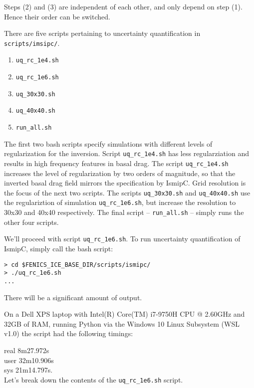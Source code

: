 \documentclass[11pt, reqno, nocenter]{article}
\begin{document}
Steps (2) and (3) are independent of each other, and only depend on step (1). Hence their order can be switched.

There are five scripts pertaining to uncertainty quantification in {\tt scripts/imsipc/}.
\begin{enumerate}
	\item {\tt uq\_rc\_1e4.sh  }
	\item {\tt uq\_rc\_1e6.sh}
	\item {\tt uq\_30x30.sh  }
	\item {\tt uq\_40x40.sh  }
	\item {\tt run\_all.sh}  
\end{enumerate}

The first two bash scripts specify simulations with different levels of regularization for the inversion. Script {\tt uq\_rc\_1e4.sh} has less regularziation and results in high frequency features in basal drag. The script {\tt uq\_rc\_1e4.sh} increases the level of regularization by two orders of magnitude, so that the inverted basal drag field mirrors the specification by IsmipC. Grid resolution is the focus of the next two scripts. The scripts {\tt uq\_30x30.sh} and {\tt uq\_40x40.sh} use the regulariztion of simulation {\tt uq\_rc\_1e6.sh}, but increase the resolution to 30x30 and 40x40 respectively. The final script -- {\tt run\_all.sh}  -- simply runs the other four scripts.

We'll proceed with script {\tt uq\_rc\_1e6.sh}. To run uncertainty quantification of IsmipC, simply call the bash script:
\begin{verbatim}
> cd $FENICS_ICE_BASE_DIR/scripts/ismipc/
> ./uq_rc_1e6.sh
...
\end{verbatim}

There will be a significant amount of output. 

On a Dell XPS laptop with Intel(R) Core(TM) i7-9750H CPU @ 2.60GHz and 32GB of RAM, running Python via the Windows 10 Linux Subsystem (WSL v1.0) the script had the following timings:   

real	\hspace{10mm} 8m27.972s \\
user  \hspace{9mm}  32m10.906s \\
sys    \hspace{11mm} 21m14.797s. \\

Let's break down the contents of the {\tt uq\_rc\_1e6.sh} script.
\end{document}
